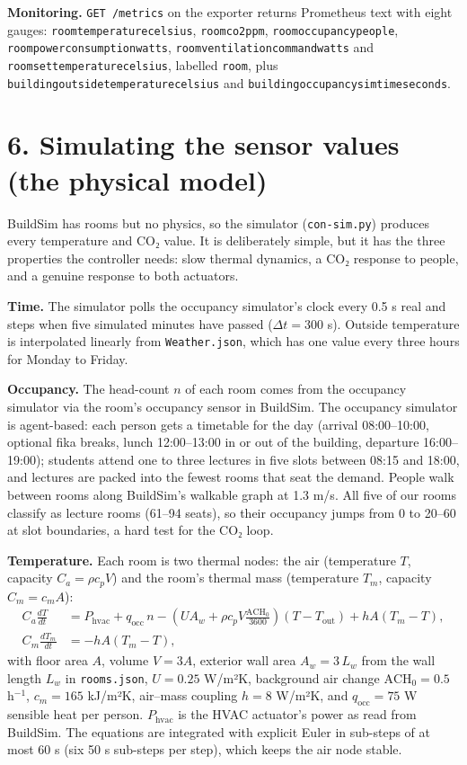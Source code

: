 \documentclass[11pt]{article}
\makeatletter
\DeclareRobustCommand{\_}{\ifmmode\nfss@text{\textunderscore}\else\textunderscore\allowbreak\fi}
\newcommand{\file}[1]{\texttt{#1}}
\makeatother
\begin{document}
\textbf{Monitoring.} \texttt{GET /metrics} on the exporter returns Prometheus
text with eight gauges: \texttt{room\_temperature\_celsius},
\texttt{room\_co2\_ppm}, \texttt{room\_occupancy\_people},
\texttt{room\_power\_consumption\_watts}, \texttt{room\_ventilation\_command\_watts}
and \texttt{room\_set\_temperature\_celsius}, labelled \texttt{room}, plus
\texttt{building\_outside\_temperature\_celsius} and
\texttt{building\_occupancy\_sim\_time\_seconds}.

\section{6. Simulating the sensor values (the physical model)}

BuildSim has rooms but no physics, so the simulator (\file{con-sim.py}) produces
every temperature and CO₂ value. It is deliberately simple, but it has the three
properties the controller needs: slow thermal dynamics, a CO₂ response to people,
and a genuine response to both actuators.

\textbf{Time.} The simulator polls the occupancy simulator's clock every 0.5 s
real and steps when five simulated minutes have passed ($\Delta t = 300$ s).
Outside temperature is interpolated linearly from \file{Weather.json}, which has
one value every three hours for Monday to Friday.

\textbf{Occupancy.} The head-count $n$ of each room comes from the occupancy
simulator via the room's occupancy sensor in BuildSim. The occupancy simulator is
agent-based: each person gets a timetable for the day (arrival 08:00–10:00,
optional fika breaks, lunch 12:00–13:00 in or out of the building, departure
16:00–19:00); students attend one to three lectures in five slots between 08:15
and 18:00, and lectures are packed into the fewest rooms that seat the demand.
People walk between rooms along BuildSim's walkable graph at 1.3 m/s. All five of
our rooms classify as lecture rooms (61–94 seats), so their occupancy jumps from
0 to 20–60 at slot boundaries, a hard test for the CO₂ loop.

\textbf{Temperature.} Each room is two thermal nodes: the air (temperature $T$,
capacity $C_a = \rho c_p V$) and the room's thermal mass (temperature $T_m$,
capacity $C_m = c_m A$):
\begin{align}
C_a \frac{dT}{dt} &= P_\text{hvac} + q_\text{occ}\, n
  - (U A_w + \rho c_p V \tfrac{\text{ACH}_0}{3600})(T - T_\text{out})
  + h A (T_m - T), \\
C_m \frac{dT_m}{dt} &= -h A (T_m - T),
\end{align}
with floor area $A$, volume $V = 3A$, exterior wall area $A_w = 3\,L_w$ from the
wall length $L_w$ in \file{rooms.json}, $U = 0.25$ W/m²K, background air change
$\text{ACH}_0 = 0.5$ h$^{-1}$, $c_m = 165$ kJ/m²K, air--mass coupling $h = 8$ W/m²K,
and $q_\text{occ} = 75$ W sensible heat per person. $P_\text{hvac}$ is the HVAC
actuator's power as read from BuildSim. The equations are integrated with
explicit Euler in sub-steps of at most 60 s (six 50 s sub-steps per step), which
keeps the air node stable.
\end{document}
